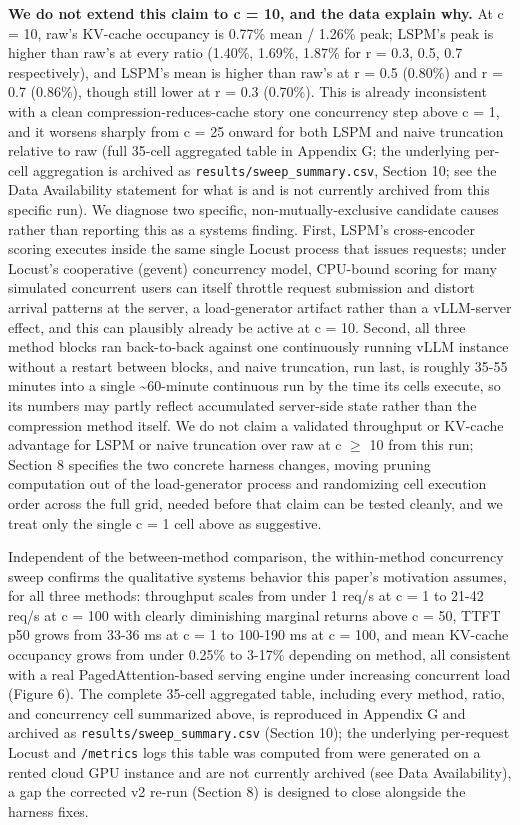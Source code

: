 \textbf{We do not extend this claim to c = 10, and the data explain why.} At c = 10, raw's KV-cache occupancy is 0.77\% mean / 1.26\% peak; LSPM's peak is higher than raw's at every ratio (1.40\%, 1.69\%, 1.87\% for r = 0.3, 0.5, 0.7 respectively), and LSPM's mean is higher than raw's at r = 0.5 (0.80\%) and r = 0.7 (0.86\%), though still lower at r = 0.3 (0.70\%). This is already inconsistent with a clean compression-reduces-cache story one concurrency step above c = 1, and it worsens sharply from c = 25 onward for both LSPM and naive truncation relative to raw (full 35-cell aggregated table in Appendix G; the underlying per-cell aggregation is archived as \texttt{results/sweep\_summary.csv}, Section 10; see the Data Availability statement for what is and is not currently archived from this specific run). We diagnose two specific, non-mutually-exclusive candidate causes rather than reporting this as a systems finding. First, LSPM's cross-encoder scoring executes inside the same single Locust process that issues requests; under Locust's cooperative (gevent) concurrency model, CPU-bound scoring for many simulated concurrent users can itself throttle request submission and distort arrival patterns at the server, a load-generator artifact rather than a vLLM-server effect, and this can plausibly already be active at c = 10. Second, all three method blocks ran back-to-back against one continuously running vLLM instance without a restart between blocks, and naive truncation, run last, is roughly 35-55 minutes into a single \textasciitilde{}60-minute continuous run by the time its cells execute, so its numbers may partly reflect accumulated server-side state rather than the compression method itself. We do not claim a validated throughput or KV-cache advantage for LSPM or naive truncation over raw at c $\geq$ 10 from this run; Section 8 specifies the two concrete harness changes, moving pruning computation out of the load-generator process and randomizing cell execution order across the full grid, needed before that claim can be tested cleanly, and we treat only the single c = 1 cell above as suggestive.

Independent of the between-method comparison, the within-method concurrency sweep confirms the qualitative systems behavior this paper's motivation assumes, for all three methods: throughput scales from under 1 req/s at c = 1 to 21-42 req/s at c = 100 with clearly diminishing marginal returns above c = 50, TTFT p50 grows from 33-36 ms at c = 1 to 100-190 ms at c = 100, and mean KV-cache occupancy grows from under 0.25\% to 3-17\% depending on method, all consistent with a real PagedAttention-based serving engine under increasing concurrent load (Figure 6). The complete 35-cell aggregated table, including every method, ratio, and concurrency cell summarized above, is reproduced in Appendix G and archived as \texttt{results/sweep\_summary.csv} (Section 10); the underlying per-request Locust and \texttt{/metrics} logs this table was computed from were generated on a rented cloud GPU instance and are not currently archived (see Data Availability), a gap the corrected v2 re-run (Section 8) is designed to close alongside the harness fixes.

